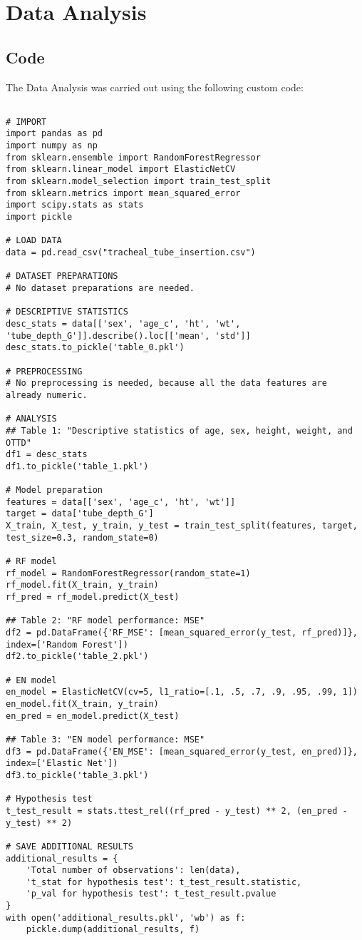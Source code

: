 \documentclass[11pt]{article}
\begin{document}
\section{Data Analysis}
\subsection{{Code}}
The Data Analysis was carried out using the following custom code:

\begin{verbatim}

# IMPORT
import pandas as pd
import numpy as np
from sklearn.ensemble import RandomForestRegressor
from sklearn.linear_model import ElasticNetCV
from sklearn.model_selection import train_test_split
from sklearn.metrics import mean_squared_error
import scipy.stats as stats
import pickle

# LOAD DATA
data = pd.read_csv("tracheal_tube_insertion.csv")

# DATASET PREPARATIONS
# No dataset preparations are needed.

# DESCRIPTIVE STATISTICS
desc_stats = data[['sex', 'age_c', 'ht', 'wt', 'tube_depth_G']].describe().loc[['mean', 'std']]
desc_stats.to_pickle('table_0.pkl')

# PREPROCESSING 
# No preprocessing is needed, because all the data features are already numeric.

# ANALYSIS
## Table 1: "Descriptive statistics of age, sex, height, weight, and OTTD"
df1 = desc_stats
df1.to_pickle('table_1.pkl')

# Model preparation
features = data[['sex', 'age_c', 'ht', 'wt']]
target = data['tube_depth_G']
X_train, X_test, y_train, y_test = train_test_split(features, target, test_size=0.3, random_state=0)

# RF model
rf_model = RandomForestRegressor(random_state=1)
rf_model.fit(X_train, y_train)
rf_pred = rf_model.predict(X_test)

## Table 2: "RF model performance: MSE"
df2 = pd.DataFrame({'RF_MSE': [mean_squared_error(y_test, rf_pred)]}, index=['Random Forest'])
df2.to_pickle('table_2.pkl')

# EN model
en_model = ElasticNetCV(cv=5, l1_ratio=[.1, .5, .7, .9, .95, .99, 1])
en_model.fit(X_train, y_train)
en_pred = en_model.predict(X_test)

## Table 3: "EN model performance: MSE"
df3 = pd.DataFrame({'EN_MSE': [mean_squared_error(y_test, en_pred)]}, index=['Elastic Net'])
df3.to_pickle('table_3.pkl')

# Hypothesis test
t_test_result = stats.ttest_rel((rf_pred - y_test) ** 2, (en_pred - y_test) ** 2)

# SAVE ADDITIONAL RESULTS
additional_results = {
    'Total number of observations': len(data), 
    't_stat for hypothesis test': t_test_result.statistic,
    'p_val for hypothesis test': t_test_result.pvalue
}
with open('additional_results.pkl', 'wb') as f:
    pickle.dump(additional_results, f)

\end{verbatim}
\end{document}
